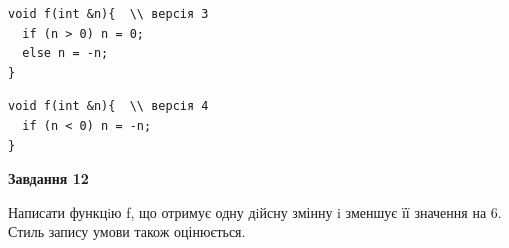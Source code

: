 \documentclass[12pt, ukrainian]{article}
\begin{document}
{\begin {large}
\begin{minipage}[t]{11.0cm}
\vspace{-8mm}\begin{verbatim}
void f(int &n){  \\ версія 3
  if (n > 0) n = 0;
  else n = -n;
}
\end{verbatim}

\vspace{-8mm}\begin{verbatim}
void f(int &n){  \\ версія 4
  if (n < 0) n = -n;
}
\end{verbatim}



\begin{center}
\textbf{Завдання 12}
\end{center}

Написати функцiю f, що отримує одну дiйсну змінну i зменшує її значення на 6. Стиль запису умови також оцінюється.\par

\end{minipage}

\end {large}}
\newpage
\end{document}
